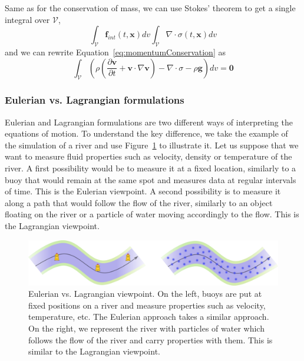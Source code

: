 Same as for the conservation of mass, we can use Stokes' theorem to get a single integral over $\mathcal{V}$,
\begin{equation}
\label{eq:internalForces}
\displaystyle 
\int_{\mathcal{V}} \mathbf{f}_{int}\left(t,\mathbf{x}\right) dv 
\int_{\mathcal{V}} \nabla \cdot \sigma\left(t,\mathbf{x}\right) dv
\end{equation}
and we can rewrite Equation~\eqref{eq:momentumConservation} as
\begin{equation}
\label{eq:volumetricMomentumConservation}
\displaystyle
\int_{\mathcal{V}} 
\left( 
\rho \left( \frac{\partial\mathbf{v}}{\partial t} + \mathbf{v} \cdot \nabla \mathbf{v} \right)
- \nabla \cdot \sigma - \rho \mathbf{g}  \right) dv = \mathbf{0}
\end{equation}

\subsubsection{Eulerian vs. Lagrangian formulations}
\label{subsubsec:starMechanics_eulerianLagrangian}
Eulerian and Lagrangian formulations are two different ways of interpreting the equations of motion.
To understand the key difference, we take the example of the simulation of a river and use Figure~\ref{fig:EulerianVsLagrangian} to illustrate it.
Let us suppose that we want to measure fluid properties such as velocity, density or temperature of the river.
A first possibility would be to measure it at a fixed location, similarly to a buoy that would remain at the same spot and measures data at regular intervals of time. This is the Eulerian viewpoint. A second possibility is to measure it along a path that would follow the flow of the river, similarly to an object floating on the river or a particle of water moving accordingly to the flow. This is the Lagrangian viewpoint.
\begin{figure}[!ht]
	\centering
	\includegraphics[width=\linewidth]{images/continuum_mechanics/eulerianVsLagrangian.png}
	\caption[STAR mechanics: Eulerian vs. Lagrangian]{\label{fig:EulerianVsLagrangian} Eulerian vs. Lagrangian viewpoint. On the left, buoys are put at fixed positions on a river and measure properties such as velocity, temperature, etc. The Eulerian approach takes a similar approach. On the right, we represent the river with particles of water which follows the flow of the river and carry properties with them. This is similar to the Lagrangian viewpoint.}
\end{figure}
